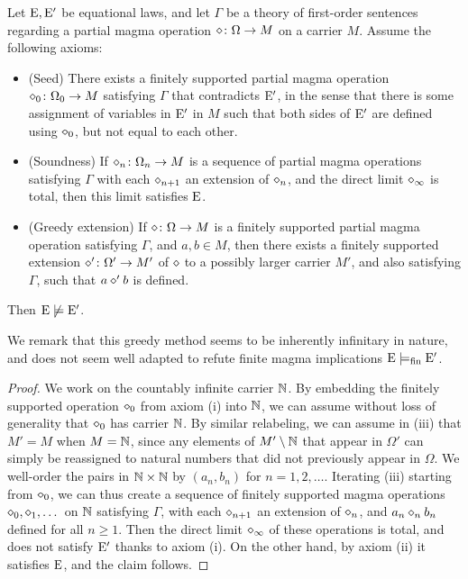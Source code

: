 \begin{theorem}\label{greedy-abstract} Let $\mathrm{E},{\mathrm{E}'}$ be equational laws, and let $\Gamma$ be a theory of first-order sentences regarding a partial magma operation $\diamond \colon \Omega \to M$ on a carrier $M$.  Assume the following axioms:
  \setlength{\parskip}{0pt}
\begin{itemize}
  \item[(i)] (Seed) There exists a finitely supported partial magma operation $\diamond_0 \colon \Omega_0 \to M$ satisfying $\Gamma$ that contradicts ${\mathrm{E}'}$, in the sense that there is some assignment of variables in ${\mathrm{E}'}$ in $M$ such that both sides of ${\mathrm{E}'}$ are defined using $\diamond_0$, but not equal to each other.
  \item[(ii)]  (Soundness)  If $\diamond_n \colon \Omega_n \to M$ is a sequence of partial magma operations satisfying $\Gamma$ with each $\diamond_{n+1}$ an extension of $\diamond_n$, and the direct limit $\diamond_\infty$ is total, then this limit satisfies $\mathrm{E}$.
  \item[(iii)] (Greedy extension)  If $\diamond \colon \Omega \to M$ is a finitely supported partial magma operation satisfying $\Gamma$, and $a,b \in M$, then there exists a finitely supported extension $\diamond' \colon \Omega' \to M'$ of $\diamond$ to a possibly larger carrier $M'$, and also satisfying $\Gamma$, such that $a \diamond' b$ is defined.
\end{itemize}
Then $\mathrm{E} \not\models {\mathrm{E}'}$.
\end{theorem}

We remark that this greedy method seems to be inherently infinitary in nature, and does not seem well adapted to refute finite magma implications $\mathrm{E} \models_{\mathrm{fin}} {\mathrm{E}'}$.

\begin{proof}  We work on the countably infinite carrier $\mathbb{N}$.  By embedding the finitely supported operation $\diamond_0$ from axiom (i) into $\mathbb{N}$, we can assume without loss of generality that $\diamond_0$ has carrier $\mathbb{N}$.  By similar relabeling, we can assume in (iii) that $M' = M$ when $M=\mathbb{N}$, since any elements of $M' \setminus \mathbb{N}$ that
appear in $\Omega'$ can simply be reassigned to natural numbers that did not previously appear in $\Omega$.  We well-order the pairs in $\mathbb{N} \times \mathbb{N}$ by $(a_n,b_n)$ for $n=1,2,\dots$.  Iterating (iii) starting from $\diamond_0$, we can thus create a sequence of finitely supported magma operations $\diamond_0, \diamond_1, \dots$ on $\mathbb{N}$ satisfying $\Gamma$, with each $\diamond_{n+1}$ an extension of $\diamond_n$, and $a_n \diamond_n b_n$ defined for all $n \geq 1$.  Then the direct limit $\diamond_\infty$ of these operations is total, and does not satisfy ${\mathrm{E}'}$ thanks to axiom (i).  On the other hand, by axiom (ii) it satisfies $\mathrm{E}$, and the claim follows.
\end{proof}

